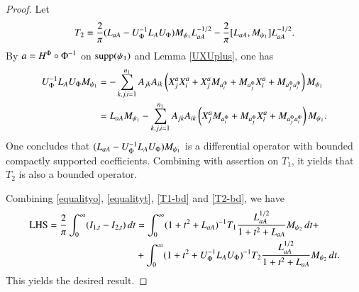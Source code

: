\documentclass[leqno]{amsart}
\begin{document}
\begin{proof}
		Let
		\begin{align}\label{T2-bd}
			T_{2}=\frac{2}{\pi}( L_{aA}-U_{\Phi}^{-1}{L_{A}} U_{\Phi})M_{\psi_{1}} L_{aA}^{-1/2}-\frac{2}{\pi}[ L_{aA},M_{\psi_{1}}] L_{aA}^{-1/2}.
		\end{align}
		By $a=H^{\Phi}\circ\Phi^{-1}$ on ${\rm supp}(\psi_{1})$ and Lemma \ref{UXUplus}, one has
		\begin{align*}
			U_{\Phi}^{-1}{L_{A}} U_{\Phi}M_{\psi_{1}}
			&=-\sum_{k,j,i=1}^{n_{1}}A_{jk}A_{ik}
			\left(X_{j}^{a}X_{i}^{a}+X_{j}^{a}M_{a_{i}^{\Phi}}+M_{a_{j}^{\Phi}}X_{i}^{a}+M_{a_{j}^{\Phi}a_{i}^{\Phi}}\right)M_{\psi_{1}}\\
			&=L_{aA}M_{\psi_{1}}-\sum_{k,j,i=1}^{n_{1}}A_{jk}A_{ik}
			\left(X_{j}^{a}M_{a_{i}^{\Phi}}+M_{a_{j}^{\Phi}}X_{i}^{a}+M_{a_{j}^{\Phi}a_{i}^{\Phi}}\right)M_{\psi_{1}}.
		\end{align*}
		One concludes that $(L_{aA}-U_{\Phi}^{-1}{L_{A}} U_{\Phi})M_{\psi_{1}}$ is a differential operator with bounded compactly supported coefficients.
		Combining with assertion on $T_{1}$, it yields that $T_{2}$ is also a bounded operator.
		
		Combining \eqref{equalityo}, \eqref{equalityt}, \eqref{T1-bd} and \eqref{T2-bd}, we have
		\begin{align*}
			{\rm LHS}=\frac{2}{\pi}\int_{0}^{\infty}(I_{1,t}-I_{2,t})\,dt
			&=\int_{0}^{\infty}(1+t^{2}+ L_{aA})^{-1}T_{1}\frac{ L_{aA}^{1/2}}{1+t^{2}+ L_{aA}}M_{\psi_{2}}\,dt+\\
			&+\int_{0}^{\infty}(1+t^{2}+U_{\Phi}^{-1}{L_{A}} U_{\Phi})^{-1}T_{2}\frac{ L_{aA}^{1/2}}{1+t^{2}+ L_{aA}}M_{\psi_{2}}\,dt.
		\end{align*}
		This yields the desired result.
	\end{proof}
	
	
	
	
	
\end{document}
